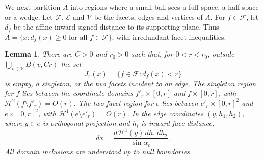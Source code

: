 \documentclass[11pt]{article}
\newtheorem{lemma}[theorem]{Lemma}
\newcommand{\HH}{\mathcal H}
\begin{document}
We next partition $A$ into regions where a small ball sees a full space,
a half-space or a wedge. Let $\mathcal F$, $\mathcal E$ and $\mathcal V$
be the facets, edges and vertices of $A$. For $f\in\mathcal F$, let
$d_f$ be the affine inward signed distance to its supporting plane.
Thus $A=\{x:d_f(x)\geq0\text{ for all }f\in\mathcal F\}$, with
irredundant facet inequalities.

\begin{lemma}\label{lem:layers}
There are $C>0$ and $r_0>0$ such that, for $0<r<r_0$, outside
$\bigcup_{v\in\mathcal V}B(v,Cr)$ the set
\[
 J_r(x)=\{f\in\mathcal F:d_f(x)<r\}
\]
is empty, a singleton, or the two facets incident to an edge.
The singleton region for $f$ lies between the coordinate domains
$f'_r\times[0,r]$ and $f\times[0,r]$, with
$\HH^2(f\setminus f'_r)=O(r)$. The two-facet region for $e$ lies between
$e'_r\times[0,r]^2$ and $e\times[0,r]^2$, with
$\HH^1(e\setminus e'_r)=O(r)$. In the edge coordinates $(y,h_1,h_2)$,
where $y\in e$ is orthogonal projection and $h_i$ is inward face distance,
\begin{equation}\label{eq:jacobian}
 dx=\frac{d\HH^1(y)\,dh_1\,dh_2}{\sin\alpha_e}.
\end{equation}
All domain inclusions are understood up to null boundaries.
\end{lemma}
\end{document}
